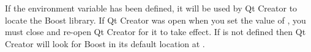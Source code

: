 If the  environment variable has been defined, it will be used by Qt Creator to locate the Boost library. If Qt Creator was open when you set the value of , you must close and re-open Qt Creator for it to take effect. If  is not defined then Qt Creator will look for Boost in its default location at .
